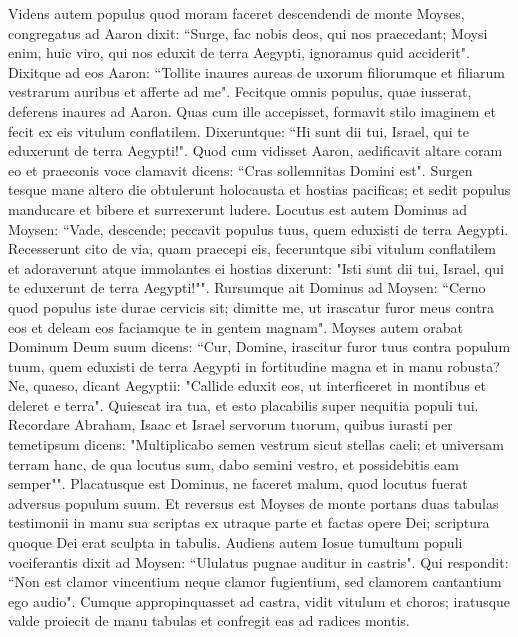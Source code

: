\begin{biblechapter}  
\verse Videns autem populus quod moram faceret descendendi de monte Moyses, congregatus ad Aaron dixit: “Surge, fac nobis deos, qui nos praecedant; Moysi enim, huic viro, qui nos eduxit de terra Aegypti, ignoramus quid acciderit". 
\verse Dixitque ad eos Aaron: “Tollite inaures aureas de uxorum filiorumque et filiarum vestrarum auribus et afferte ad me". 
\verse Fecitque omnis populus, quae iusserat, deferens inaures ad Aaron. 
\verse Quas cum ille accepisset, formavit stilo imaginem et fecit ex eis vitulum conflatilem. Dixeruntque: “Hi sunt dii tui, Israel, qui te eduxerunt de terra Aegypti!". 
\verse Quod cum vidisset Aaron, aedificavit altare coram eo et praeconis voce clamavit dicens: “Cras sollemnitas Domini est". 
\verse Surgen tesque mane altero die obtulerunt holocausta et hostias pacificas; et sedit populus manducare et bibere et surrexerunt ludere. 
\verse Locutus est autem Dominus ad Moysen: “Vade, descende; peccavit populus tuus, quem eduxisti de terra Aegypti. 
\verse Recesserunt cito de via, quam praecepi eis, feceruntque sibi vitulum conflatilem et adoraverunt atque immolantes ei hostias dixerunt: "Isti sunt dii tui, Israel, qui te eduxerunt de terra Aegypti!"". 
\verse Rursumque ait Dominus ad Moysen: “Cerno quod populus iste durae cervicis sit; 
\verse dimitte me, ut irascatur furor meus contra eos et deleam eos faciamque te in gentem magnam". 
\verse Moyses autem orabat Dominum Deum suum dicens: “Cur, Domine, irascitur furor tuus contra populum tuum, quem eduxisti de terra Aegypti in fortitudine magna et in manu robusta? 
\verse Ne, quaeso, dicant Aegyptii: "Callide eduxit eos, ut interficeret in montibus et deleret e terra". Quiescat ira tua, et esto placabilis super nequitia populi tui. 
\verse Recordare Abraham, Isaac et Israel servorum tuorum, quibus iurasti per temetipsum dicens: "Multiplicabo semen vestrum sicut stellas caeli; et universam terram hanc, de qua locutus sum, dabo semini vestro, et possidebitis eam semper"". 
\verse Placatusque est Dominus, ne faceret malum, quod locutus fuerat adversus populum suum. 
\verse Et reversus est Moyses de monte portans duas tabulas testimonii in manu sua scriptas ex utraque parte 
\verse et factas opere Dei; scriptura quoque Dei erat sculpta in tabulis. 
\verse Audiens autem Iosue tumultum populi vociferantis dixit ad Moysen: “Ululatus pugnae auditur in castris". 
\verse Qui respondit: “Non est clamor vincentium neque clamor fugientium, sed clamorem cantantium ego audio". 
\verse Cumque appropinquasset ad castra, vidit vitulum et choros; iratusque valde proiecit de manu tabulas et confregit eas ad radices montis. 

\end{biblechapter}
